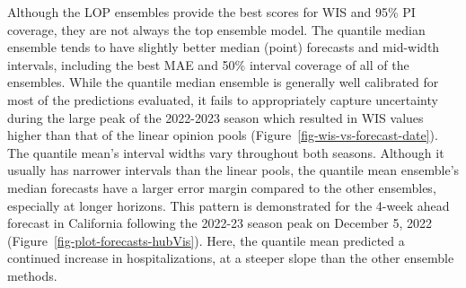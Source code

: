 \documentclass[
]{article}
\begin{document}
Although the LOP ensembles provide the best scores for WIS and 95\% PI
coverage, they are not always the top ensemble model. The quantile
median ensemble tends to have slightly better median (point) forecasts
and mid-width intervals, including the best MAE and 50\% interval
coverage of all of the ensembles. While the quantile median ensemble is
generally well calibrated for most of the predictions evaluated, it
fails to appropriately capture uncertainty during the large peak of the
2022-2023 season which resulted in WIS values higher than that of the
linear opinion pools (Figure~\ref{fig-wis-vs-forecast-date}). The
quantile mean's interval widths vary throughout both seasons. Although
it usually has narrower intervals than the linear pools, the quantile
mean ensemble's median forecasts have a larger error margin compared to
the other ensembles, especially at longer horizons. This pattern is
demonstrated for the 4-week ahead forecast in California following the
2022-23 season peak on December 5, 2022
(Figure~\ref{fig-plot-forecasts-hubVis}). Here, the quantile mean
predicted a continued increase in hospitalizations, at a steeper slope
than the other ensemble methods.
\end{document}
